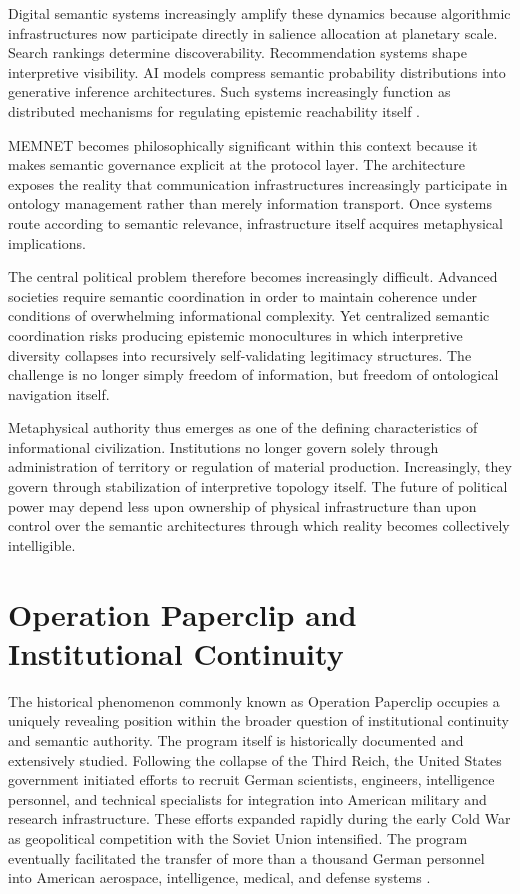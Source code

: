 \documentclass[11pt,a4paper]{article}
\begin{document}
Digital semantic systems increasingly amplify these dynamics because algorithmic infrastructures now participate directly in salience allocation at planetary scale. Search rankings determine discoverability. Recommendation systems shape interpretive visibility. AI models compress semantic probability distributions into generative inference architectures. Such systems increasingly function as distributed mechanisms for regulating epistemic reachability itself \cite{zuboff2019}.

MEMNET becomes philosophically significant within this context because it makes semantic governance explicit at the protocol layer. The architecture exposes the reality that communication infrastructures increasingly participate in ontology management rather than merely information transport. Once systems route according to semantic relevance, infrastructure itself acquires metaphysical implications.

The central political problem therefore becomes increasingly difficult. Advanced societies require semantic coordination in order to maintain coherence under conditions of overwhelming informational complexity. Yet centralized semantic coordination risks producing epistemic monocultures in which interpretive diversity collapses into recursively self-validating legitimacy structures. The challenge is no longer simply freedom of information, but freedom of ontological navigation itself.

Metaphysical authority thus emerges as one of the defining characteristics of informational civilization. Institutions no longer govern solely through administration of territory or regulation of material production. Increasingly, they govern through stabilization of interpretive topology itself. The future of political power may depend less upon ownership of physical infrastructure than upon control over the semantic architectures through which reality becomes collectively intelligible.

\section{Operation Paperclip and Institutional Continuity}

The historical phenomenon commonly known as Operation Paperclip occupies a uniquely revealing position within the broader question of institutional continuity and semantic authority. The program itself is historically documented and extensively studied. Following the collapse of the Third Reich, the United States government initiated efforts to recruit German scientists, engineers, intelligence personnel, and technical specialists for integration into American military and research infrastructure. These efforts expanded rapidly during the early Cold War as geopolitical competition with the Soviet Union intensified. The program eventually facilitated the transfer of more than a thousand German personnel into American aerospace, intelligence, medical, and defense systems \cite{jacobsen2014}.
\end{document}
